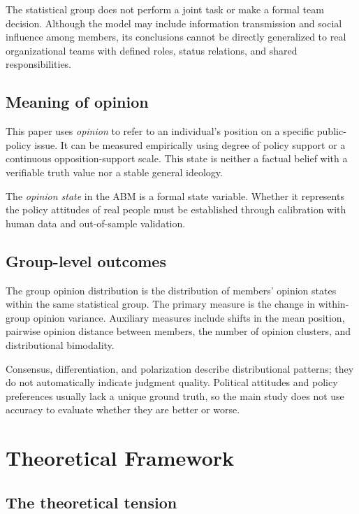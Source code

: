 \documentclass[11pt,a4paper]{article}
\newcommand{\term}[1]{\textit{#1}}
\begin{document}
The statistical group does not perform a joint task or make a formal team decision. Although the model may include information transmission and social influence among members, its conclusions cannot be directly generalized to real organizational teams with defined roles, status relations, and shared responsibilities.

\subsection{Meaning of opinion}

This paper uses \term{opinion} to refer to an individual's position on a specific public-policy issue. It can be measured empirically using degree of policy support or a continuous opposition-support scale. This state is neither a factual belief with a verifiable truth value nor a stable general ideology.

The \term{opinion state} in the ABM is a formal state variable. Whether it represents the policy attitudes of real people must be established through calibration with human data and out-of-sample validation.

\subsection{Group-level outcomes}

The group opinion distribution is the distribution of members' opinion states within the same statistical group. The primary measure is the change in within-group opinion variance. Auxiliary measures include shifts in the mean position, pairwise opinion distance between members, the number of opinion clusters, and distributional bimodality.

Consensus, differentiation, and polarization describe distributional patterns; they do not automatically indicate judgment quality. Political attitudes and policy preferences usually lack a unique ground truth, so the main study does not use accuracy to evaluate whether they are better or worse.

\section{Theoretical Framework}

\subsection{The theoretical tension}
\end{document}
